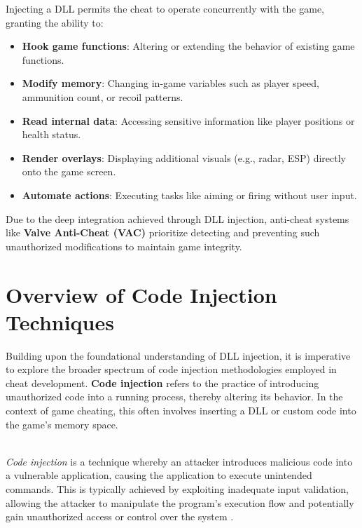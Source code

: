 Injecting a DLL permits the cheat to operate concurrently with the game, granting the ability to:

\begin{itemize}
    \item \textbf{Hook game functions}: Altering or extending the behavior of existing game functions.
    \item \textbf{Modify memory}: Changing in-game variables such as player speed, ammunition count, or recoil patterns.
    \item \textbf{Read internal data}: Accessing sensitive information like player positions or health status.
    \item \textbf{Render overlays}: Displaying additional visuals (e.g., radar, ESP) directly onto the game screen.
    \item \textbf{Automate actions}: Executing tasks like aiming or firing without user input.
\end{itemize}

Due to the deep integration achieved through DLL injection, anti-cheat systems like \textbf{Valve Anti-Cheat (VAC)} prioritize detecting and preventing such unauthorized modifications to maintain game integrity.

\section{Overview of Code Injection Techniques}

Building upon the foundational understanding of DLL injection, it is imperative to explore the broader spectrum of code injection methodologies employed in cheat development. \textbf{Code injection} refers to the practice of introducing unauthorized code into a running process, thereby altering its behavior. In the context of game cheating, this often involves inserting a DLL or custom code into the game's memory space.

\begin{tcolorbox}[colback=gray!10, colframe=gray!50, boxrule=0pt, sharp corners, width=\linewidth, left=1mm, right=1mm, top=0.5mm, bottom=0.5mm]
 \\
\textit{Code injection} is a technique whereby an attacker introduces malicious code into a vulnerable application, causing the application to execute unintended commands. This is typically achieved by exploiting inadequate input validation, allowing the attacker to manipulate the program's execution flow and potentially gain unauthorized access or control over the system \parencite{owasp2025codeinjection}.
\end{tcolorbox}

